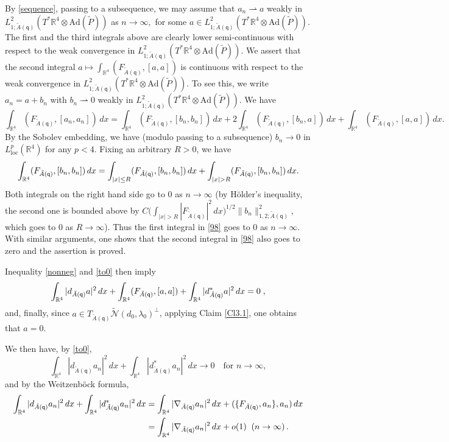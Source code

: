 \documentclass[11pt]{article}
\numberwithin{equation}{section} \setlength{\topmargin}{-35pt}
\newcommand{\R}{\mathbb{R}}
\newcommand{\Ad}{\text{Ad}}
\newcommand{\q}{\mathsf{q}}
\newcommand{\loc}{\text{loc}}
\begin{document}
By \eqref{sequence}, passing to a subsequence, we may assume that
$a_n\rightharpoonup a$ weakly in
$L^2_{1;\tilde{A}(\q)}(T^{\ast}\R^4\otimes\Ad(\tilde{P}))$ as
$n\to\infty,$ for some $a\in
L^2_{1;\tilde{A}(\q)}(T^{\ast}\R^4\otimes\Ad(\tilde{P}))$. The first
and the third integrals above are clearly lower semi-continuous with
respect to the weak convergence in
$L^2_{1;\tilde{A}(\q)}(T^{\ast}\R^4\otimes\Ad(\tilde{P}))$. We
assert that the second integral
$a\mapsto\int_{\R^4}(F_{\tilde{A}(\q)},[a,a]) $ is continuous with
respect to the weak convergence in
$L^2_{1;\tilde{A}(\q)}(T^{\ast}\R^4\otimes\Ad(\tilde{P}))$. To see
this, we write $a_n=a+b_n$ with $b_n\rightharpoonup 0$ weakly in
$L^2_{1;\tilde{A}(\q)}(T^{\ast}\R^4\otimes\Ad(\tilde{P}))$. We have
\begin{equation}
\label{98}
\int_{\R^4}(F_{\tilde{A}(\q)},[a_n,a_n])\,dx=\int_{\R^4}(F_{\tilde{A}(\q)},[b_n,b_n])\,dx+
2\int_{\R^4}(F_{\tilde{A}(\q)},[b_n,a])\,dx+\int_{\R^4}(F_{\tilde{A}(\q)},[a,a])\,dx.
\end{equation}
By the Sobolev embedding, we have (modulo passing to a subsequence)
$b_n\to 0$ in $L^p_{\loc}(\R^4)$ for any $p<4$. Fixing an arbitrary
$R>0$, we have
\begin{equation}
\notag \int_{\R^4}(F_{\tilde{A}(\q)},[b_n,b_n])\,dx=\int_{|x|\le
R}(F_{\tilde{A}(\q)},[b_n,b_n])\,dx+\int_{|x|>R}(F_{\tilde{A}(\q)},[b_n,b_n])\,dx.
\end{equation}
Both integrals on the right hand side go to $0$ as $n\to\infty$ (by
H\"older's inequality, the second one is bounded above by
$C\big(\int_{|x|>R}|F_{\tilde{A}(\q)}|^2\,dx\big)^{1/2}\|b_n\|_{1,2;\tilde{A}(\q)}^2$,
which goes to $0$ as $R\to\infty$). Thus the first integral in
\eqref{98} goes to $0$ as $n\to\infty$. With similar arguments, one
shows that the second integral in \eqref{98} also goes to zero and
the assertion is proved.

Inequality \eqref{nonneg} and \eqref{to0} then imply
\begin{equation}
\notag
\int_{\R^4}|d_{\tilde{A}(\q)}a|^2\,dx+\int_{\R^4}(F_{\tilde{A}(\q)},[a,a])
+\int_{\R^4}|d_{\tilde{A}(\q)}^{\ast}a|^2\,dx=0\;,
\end{equation}
and, finally, since $a\in T_{\tilde{A}(\q)}\tilde{\mathcal
N}(d_0,\lambda_0)^{\perp}$, applying Claim \ref{Cl3.1}, one obtains
that $a=0$.

We then have, by \eqref{to0},
\begin{equation}
\label{101}
\int_{\R^4}|d_{\tilde{A}(\q)}a_n|^2\,dx+\int_{\R^4}|d_{\tilde{A}(\q)}^{\ast}a_n|^2\,dx\to
0\quad\text{for $n\to\infty$},
\end{equation}
and by the Weitzenb\"ock formula,
\begin{align}
\label{102}
\int_{\R^4}|d_{\tilde{A}(\q)}a_n|^2\,dx+\int_{\R^4}|d_{\tilde{A}(\q)}^{\ast}a_n|^2\,dx
&=
\int_{\R^4}|\nabla_{\tilde{A}(\q)}a_n|^2\,dx+(\{F_{\tilde{A}(\q)},a_n\},a_n)\,dx\notag\\
&=\int_{\R^4}|\nabla_{\tilde{A}(\q)}a_n|^2\,dx+o(1)\;\;
 (n\to\infty)\,.
\end{align}
\end{document}
